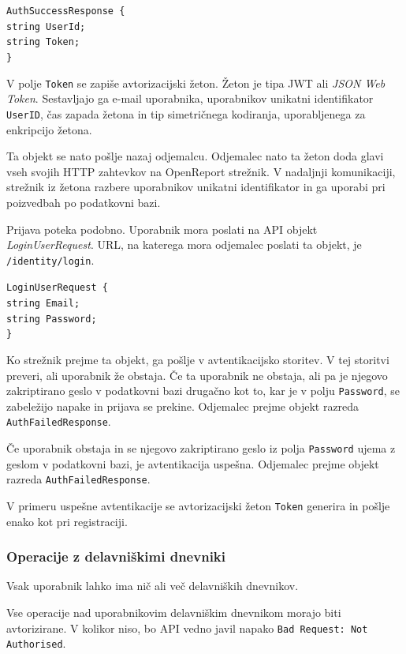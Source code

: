 \documentclass[a4paper, 12pt]{book}
\begin{document}
\noindent \texttt{AuthSuccessResponse \{ \\
  string UserId; \\
  string Token; \\
\} }

\noindent V polje \texttt{Token} se zapiše avtorizacijski žeton.
Žeton je tipa JWT ali \textit{JSON Web Token}.
Sestavljajo ga e-mail uporabnika, uporabnikov unikatni identifikator \texttt{UserID}, čas zapada žetona in tip simetričnega kodiranja, uporabljenega za enkripcijo žetona.

Ta objekt se nato pošlje nazaj odjemalcu.
Odjemalec nato ta žeton doda glavi vseh svojih HTTP zahtevkov na OpenReport strežnik.
V nadaljnji komunikaciji, strežnik iz žetona razbere uporabnikov unikatni identifikator in ga uporabi pri poizvedbah po podatkovni bazi.

Prijava poteka podobno.
Uporabnik mora poslati na API objekt \textit{LoginUserRequest}.
URL, na katerega mora odjemalec poslati ta objekt, je \texttt{/identity/login}.

\noindent
\texttt{LoginUserRequest \{ \\
  string Email; \\
  string Password; \\
\} }

Ko strežnik prejme ta objekt, ga pošlje v avtentikacijsko storitev.
V tej storitvi preveri, ali uporabnik že obstaja.
Če ta uporabnik ne obstaja, ali pa je njegovo zakriptirano geslo v podatkovni bazi drugačno kot to, kar je v polju \texttt{Password}, se zabeležijo napake in prijava se prekine.
Odjemalec prejme objekt razreda \texttt{AuthFailedResponse}.

Če uporabnik obstaja in se njegovo zakriptirano geslo iz polja \texttt{Password} ujema z geslom v podatkovni bazi, je avtentikacija uspešna.
Odjemalec prejme objekt razreda \texttt{AuthFailedResponse}.

V primeru uspešne avtentikacije se avtorizacijski žeton \texttt{Token} generira in pošlje enako kot pri registraciji.

\subsubsection{Operacije z delavniškimi dnevniki}

Vsak uporabnik lahko ima nič ali več delavniških dnevnikov.

Vse operacije nad uporabnikovim delavniškim dnevnikom morajo biti avtorizirane.
V kolikor niso, bo API vedno javil napako \texttt{Bad Request: Not Authorised}.
\end{document}
